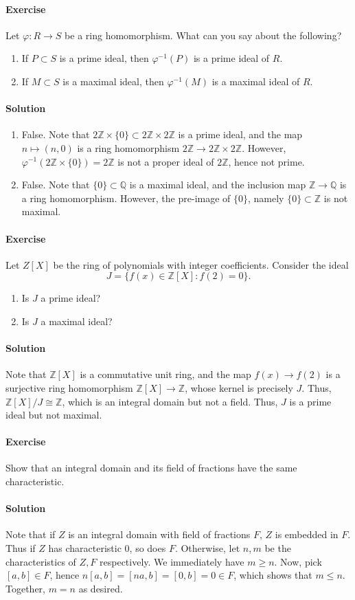 \documentclass[10pt]{article}
\newcounter{prob}
\newcommand{\problem}{\stepcounter{prob}\paragraph{Exercise \arabic{prob}}}
\newcommand{\solution}{\paragraph{Solution}}
\newcommand{\Q}{\mathbb{Q}}
\newcommand{\Z}{\mathbb{Z}}
\begin{document}
    \problem Let $\varphi\colon R \to S$ be a ring homomorphism. What can you say
    about the following?
    \begin{enumerate}
        \item If $P\subset S$ is a prime ideal, then $\varphi^{-1}(P)$ is a prime
        ideal of $R$.
        \item If $M\subset S$ is a maximal ideal, then $\varphi^{-1}(M)$ is a maximal
        ideal of $R$.
    \end{enumerate}
    \solution \mbox{}
    \begin{enumerate}
        \item False. Note that $2\Z\times \{0\} \subset 2\Z\times 2\Z$ is a prime
        ideal, and the map $n \mapsto (n, 0)$ is a ring homomorphism $2\Z \to
        2\Z\times 2\Z$. However, $\varphi^{-1}(2\Z \times \{0\}) = 2\Z$ is not a
        proper ideal of $2\Z$, hence not prime.

        \item False. Note that $\{0\} \subset \Q$ is a maximal ideal, and the
        inclusion map $\Z \to \Q$ is a ring homomorphism. However, the pre-image of
        $\{0\}$, namely $\{0\}\subset \Z$ is not maximal.
    \end{enumerate}


    \problem Let $Z[X]$ be the ring of polynomials with integer coefficients.
    Consider the ideal \[
        J = \{f(x) \in \Z[X]: f(2) = 0\}.
    \] \begin{enumerate}
        \item Is $J$ a prime ideal?
        \item Is $J$ a maximal ideal?
    \end{enumerate}

    \solution Note that $\Z[X]$ is a commutative unit ring, and the map $f(x) \to
    f(2)$ is a surjective ring homomorphism $\Z[X] \to \Z$, whose kernel is precisely
    $J$. Thus, $\Z[X]/J \cong \Z$, which is an integral domain but not a field. Thus,
    $J$ is a prime ideal but not maximal.


    \problem Show that an integral domain and its field of fractions have the same
    characteristic.

    \solution Note that if $Z$ is an integral domain with field of fractions $F$, $Z$
    is embedded in $F$. Thus if $Z$ has characteristic $0$, so does $F$. Otherwise,
    let $n, m$ be the characteristics of $Z, F$ respectively. We immediately have $m
    \geq n$. Now, pick $[a, b] \in F$, hence $n[a, b] = [na, b] = [0, b] = 0 \in F$,
    which shows that $m \leq n$. Together, $m = n$ as desired.
\end{document}
